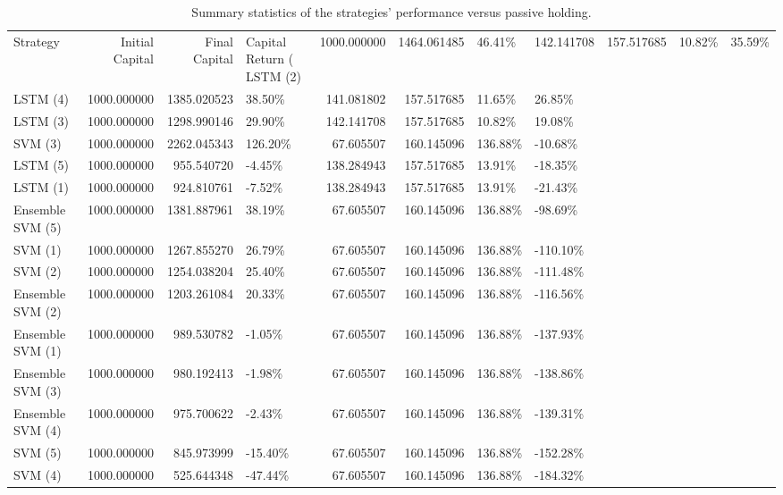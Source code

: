 \begin{table}
\caption{Summary statistics of the strategies' performance versus passive holding.}
\label{tbl:strategy_stats}
\begin{tabular}{lrrlrrll}
\toprule
Strategy & Initial Capital & Final Capital & Capital Return (%
\midrule
LSTM (2) & 1000.000000 & 1464.061485 & 46.41\% & 142.141708 & 157.517685 & 10.82\% & 35.59\% \\
LSTM (4) & 1000.000000 & 1385.020523 & 38.50\% & 141.081802 & 157.517685 & 11.65\% & 26.85\% \\
LSTM (3) & 1000.000000 & 1298.990146 & 29.90\% & 142.141708 & 157.517685 & 10.82\% & 19.08\% \\
SVM (3) & 1000.000000 & 2262.045343 & 126.20\% & 67.605507 & 160.145096 & 136.88\% & -10.68\% \\
LSTM (5) & 1000.000000 & 955.540720 & -4.45\% & 138.284943 & 157.517685 & 13.91\% & -18.35\% \\
LSTM (1) & 1000.000000 & 924.810761 & -7.52\% & 138.284943 & 157.517685 & 13.91\% & -21.43\% \\
Ensemble SVM (5) & 1000.000000 & 1381.887961 & 38.19\% & 67.605507 & 160.145096 & 136.88\% & -98.69\% \\
SVM (1) & 1000.000000 & 1267.855270 & 26.79\% & 67.605507 & 160.145096 & 136.88\% & -110.10\% \\
SVM (2) & 1000.000000 & 1254.038204 & 25.40\% & 67.605507 & 160.145096 & 136.88\% & -111.48\% \\
Ensemble SVM (2) & 1000.000000 & 1203.261084 & 20.33\% & 67.605507 & 160.145096 & 136.88\% & -116.56\% \\
Ensemble SVM (1) & 1000.000000 & 989.530782 & -1.05\% & 67.605507 & 160.145096 & 136.88\% & -137.93\% \\
Ensemble SVM (3) & 1000.000000 & 980.192413 & -1.98\% & 67.605507 & 160.145096 & 136.88\% & -138.86\% \\
Ensemble SVM (4) & 1000.000000 & 975.700622 & -2.43\% & 67.605507 & 160.145096 & 136.88\% & -139.31\% \\
SVM (5) & 1000.000000 & 845.973999 & -15.40\% & 67.605507 & 160.145096 & 136.88\% & -152.28\% \\
SVM (4) & 1000.000000 & 525.644348 & -47.44\% & 67.605507 & 160.145096 & 136.88\% & -184.32\% \\
\bottomrule
\end{tabular}
\end{table}
